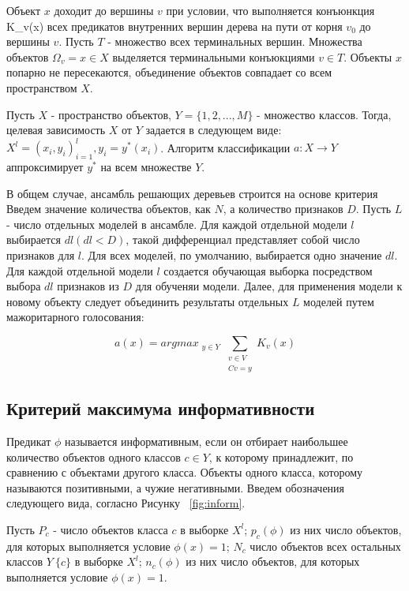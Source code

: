 Объект $x$ доходит до вершины $v$ при условии, что выполняется конъюнкция K_{v}(x) всех предикатов внутренних вершин дерева на пути от корня $v_{0}$ до вершины $v$. Пусть $T$ - множество всех терминальных вершин. Множества объектов $\Omega_{v} = {x \in X }$ выделяется терминальными конъюкциями $v \in T$. Объекты $x$ попарно не пересекаются, объединение объектов совпадает со всем пространством $X$.

Пусть $X $ - пространство объектов, $Y = \{1,2, ..., M\}$ - множество классов. Тогда, целевая зависимость $X $ от $Y$ задается в следующем виде: $X^{l} = (x_{i},y_{i})^l_{i=1}, y_{i} = y^*(x_{i})$. Алгоритм классификации $ a: X \rightarrow Y $ аппроксимирует $y^*$ на всем множестве $Y$.

В общем случае, ансамбль решающих деревьев строится на основе критерия
Введем значение количества объектов, как $N$, а количество признаков $ D $. Пусть $L$ - число отдельных моделей в ансамбле. Для каждой отдельной модели $l$ выбирается $dl (dl < D)$, такой дифференциал представляет собой число признаков для $l$. Для всех моделей, по умолчанию, выбирается одно значение $dl$. Для каждой отдельной модели $l$ создается обучающая выборка посредством выбора $dl$ признаков из $D$ для обученяи модели. Далее, для применения модели к новому объекту следует объединить результаты отдельных $L$ моделей путем мажоритарного голосования:

\begin{equation}
    \label{eq:equation29}
    a(x) = argmax_{\substack{ y \in Y
  }} \sum_{\substack{
   v \in V \\
   Cv = y
  }} 
 K_{v}(x)
\end{equation}

\subsection{Критерий максимума информативности}\label{sec:ch2/sec3/sub3}

Предикат $\phi$ называется информативным, если он отбирает наибольшее количество объектов одного классов $c \in Y$, к которому принадлежит, по сравнению с объектами другого класса. Объекты одного класса, которому называются позитивными, а чужие негативными. Введем обозначения следующего вида, согласно Рисунку ~\cref{fig:inform}.

Пусть $P_c$ - число объектов класса $c$ в выборке $X^{l}$; $p_c(\phi)$ из них число объектов, для которых выполняется условие $\phi(x) = 1 $; $N_c$ число объектов всех остальных классов $Y \ \{c\}$ в выборке $X^{l}$; $n_c(\phi)$ из них число объектов, для которых выполняется условие $\phi(x) = 1 $.

